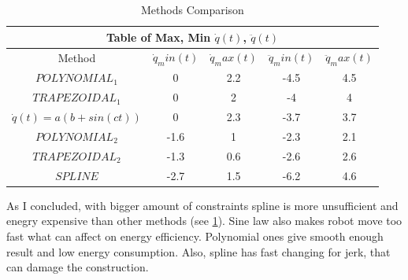 \documentclass[12pt, a4paper]{report}
\begin{document}
\begin{table}[H]
\centering
\begin{tabular}{ |c||c||c||c||c| }
 \hline
 \multicolumn{5}{|c|}{Table of Max, Min $\dot{q}(t)$, $\ddot{q}(t)$} \\
 \hline
 Method & $\dot{q}_min(t)$ & $\dot{q}_max(t)$ & $\ddot{q}_min(t)$ & $\ddot{q}_max(t)$\\
 \hline
 $POLYNOMIAL_1$ & 0 & 2.2 & -4.5 & 4.5\\
 $TRAPEZOIDAL_1$ & 0 & 2 & -4 & 4\\
 $\dot{q}(t) = a(b + sin(ct))$ & 0 & 2.3 & -3.7 & 3.7\\
 $POLYNOMIAL_2$ & -1.6 & 1 & -2.3 & 2.1\\
 $TRAPEZOIDAL_2$ & -1.3 & 0.6 & -2.6 & 2.6\\
 $SPLINE$ & -2.7 & 1.5 & -6.2 & 4.6\\
 \hline
\end{tabular}
\caption{Methods Comparison}
\label{table:1}
\end{table}
 
 As I concluded, with bigger amount of constraints spline is more unsufficient and enegry expensive than other methods (see \ref{table:1}). Sine law also makes robot move too fast what can affect on energy efficiency. Polynomial ones give smooth enough result and low energy consumption. Also, spline has fast changing for jerk, that can damage the construction.
 
\end{document}
